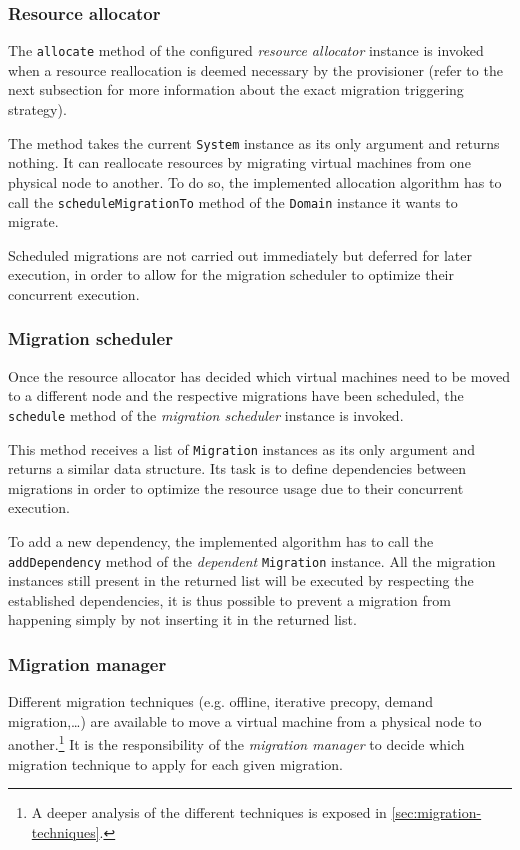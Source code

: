 \subsubsection{Resource allocator}

The \texttt{allocate} method of the configured \emph{resource allocator} instance is invoked when a resource reallocation is deemed necessary by the provisioner (refer to the next subsection for more information about the exact migration triggering strategy).

The method takes the current \texttt{System} instance as its only argument and returns nothing. It can reallocate resources by migrating virtual machines from one physical node to another. To do so, the implemented allocation algorithm has to call the \texttt{scheduleMigrationTo} method of the \texttt{Domain} instance it wants to migrate.

Scheduled migrations are not carried out immediately but deferred for later execution, in order to allow for the migration scheduler to optimize their concurrent execution.

\subsubsection{Migration scheduler}

Once the resource allocator has decided which virtual machines need to be moved to a different node and the respective migrations have been scheduled, the \texttt{schedule} method of the \emph{migration scheduler} instance is invoked. 

This method receives a list of \texttt{Migration} instances as its only argument and returns a similar data structure. Its task is to define dependencies between migrations in order to optimize the resource usage due to their concurrent execution.

To add a new dependency, the implemented algorithm has to call the \texttt{addDependency} method of the \emph{dependent} \texttt{Migration} instance. All the migration instances still present in the returned list will be executed by respecting the established dependencies, it is thus possible to prevent a migration from happening simply by not inserting it in the returned list.

\subsubsection{Migration manager}

Different migration techniques (e.g. offline, iterative precopy, demand migration,…) are available to move a virtual machine from a physical node to another.\footnote{A deeper analysis of the different techniques is exposed in \autoref{sec:migration-techniques}.} It is the responsibility of the \emph{migration manager} to decide which migration technique to apply for each given migration.

